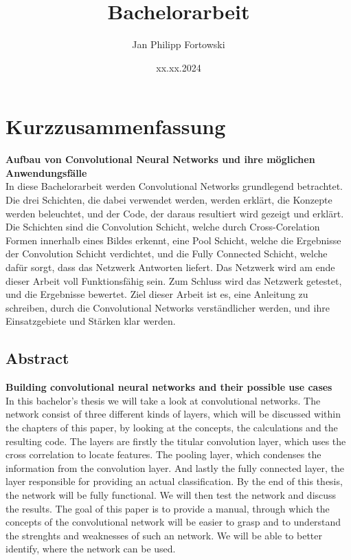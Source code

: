 \documentclass[12pt]{article}
\title{\textbf{Bachelorarbeit}}
\author{Jan Philipp Fortowski}
\date{xx.xx.2024}
\begin{document}

\thispagestyle{empty}

\cleardoublepage
\thispagestyle{empty}
\section*{Kurzzusammenfassung}
\textbf{Aufbau von Convolutional Neural Networks und
ihre möglichen Anwendungsfälle}\\

In diese Bachelorarbeit werden Convolutional Networks grundlegend betrachtet. Die drei Schichten, die dabei verwendet werden, werden erklärt, die Konzepte werden beleuchtet, und der Code, der daraus resultiert wird gezeigt und erklärt. Die Schichten sind die Convolution Schicht, welche durch Cross-Corelation Formen innerhalb eines Bildes erkennt, eine Pool Schicht, welche die Ergebnisse der Convolution Schicht verdichtet, und die Fully Connected Schicht, welche dafür sorgt, dass das Netzwerk Antworten liefert. Das Netzwerk wird am ende dieser Arbeit voll Funktionsfähig sein. Zum Schluss wird das Netzwerk getestet, und die Ergebnisse bewertet. Ziel dieser Arbeit ist es, eine Anleitung zu schreiben, durch die Convolutional Networks verständlicher werden, und ihre Einsatzgebiete und Stärken klar werden.

\cleardoublepage
\thispagestyle{empty}
\subsection*{Abstract}
\textbf{Building convolutional neural networks and their
possible use cases}\\

In this bachelor's thesis we will take a look at convolutional networks.
The network consist of three different kinds of layers, which will be discussed within the chapters of this paper, by looking at the concepts, the calculations and the resulting code. 
The layers are firstly the titular convolution layer, which uses the cross correlation to locate features. The pooling layer, which condenses the information from the convolution layer. And lastly the fully connected layer, the layer responsible for providing an actual classification.
By the end of this thesis, the network will be fully functional.
We will then test the network and discuss the results.
The goal of this paper is to provide a manual, through which the concepts of the convolutional network will be easier to grasp and to understand the strenghts and weaknesses of such an network. We will be able to better identify, where the network can be used.
\end{document}
